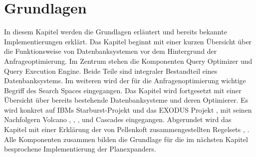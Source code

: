 \newpage
\section{Grundlagen}


In diesem Kapitel werden die Grundlagen erläutert und bereits bekannte Implementierungen erklärt.  Das Kapitel beginnt mit einer kurzen Übersicht über die Funktionsweise von Datenbanksystemen vor dem Hintergrund der Anfrageoptimierung. Im Zentrum stehen die Komponenten Query Optimizer und Query Execution Engine. Beide Teile sind integraler Bestandteil eines Datenbanksystems. Im weiteren wird der für die Anfragenoptimierung wichtige Begriff des Search Spaces eingegangen. Das Kapitel wird fortgesetzt mit einer Übersicht über bereits bestehende Datenbanksysteme und deren Optimierer. Es wird konkret auf IBMs Starburst-Projekt und das EXODUS Projekt \cite{graefe1987exodus}, \cite{carey1990exodus} mit seinen Nachfolgern Volcano \cite{graefe1990parallelizing}, \cite{graefe1990encapsulation}, \cite{graefe1993volcano}, \cite{graefe1994volcano} und Cascades \cite{graefe1995cascades} eingegangen. Abgerundet wird das Kapitel mit einer Erklärung der von Pellenkoft zusammengestellten Regelsets \cite{pellenkoft1997complexity}, \cite{pellenkoft1997duplicate}. Alle Komponenten zusammen bilden die Grundlage für die im nächsten Kapitel besprochene Implementierung der Planexpanders.









